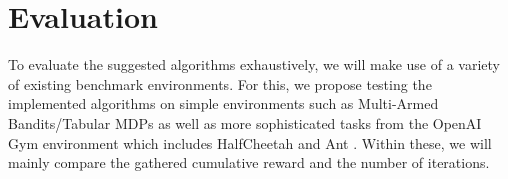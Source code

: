 \documentclass{article}
\begin{document}


\section{Evaluation}

To evaluate the suggested algorithms exhaustively, we will make use of a variety of existing benchmark environments. For this, we propose testing the implemented algorithms on simple environments such as Multi-Armed Bandits/Tabular MDPs \cite{duan_rl2_2016} as well as more sophisticated tasks from the OpenAI Gym environment which includes HalfCheetah and Ant \cite{finn_model-agnostic_2017}. Within these, we will mainly compare the gathered cumulative reward and the number of iterations.

\medskip
\nocite{*}


\end{document}
